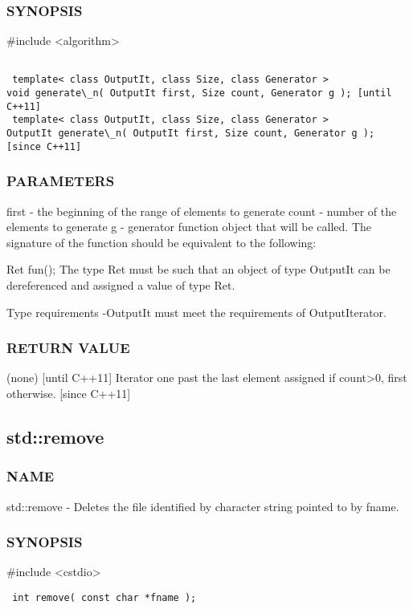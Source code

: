 \subsubsection{SYNOPSIS}
\#include <algorithm>

\begin{lstlisting}

 template< class OutputIt, class Size, class Generator >
void generate\_n( OutputIt first, Size count, Generator g ); [until C++11]
 template< class OutputIt, class Size, class Generator >
OutputIt generate\_n( OutputIt first, Size count, Generator g ); [since C++11]
\end{lstlisting}

\subsubsection{PARAMETERS}
first - the beginning of the range of elements to generate
count - number of the elements to generate
g - generator function object that will be called.
The signature of the function should be equivalent to the following:

 Ret fun();
The type Ret must be such that an object of type OutputIt can be dereferenced and assigned a value of type Ret.

 Type requirements
 -OutputIt must meet the requirements of OutputIterator.

\subsubsection{RETURN VALUE}
 (none) [until C++11]
 Iterator one past the last element assigned if count>0, first otherwise. [since C++11]


\subsection{std::remove}

\subsubsection{NAME}
std::remove - Deletes the file identified by character string pointed to by fname.

\subsubsection{SYNOPSIS}
\#include <cstdio>

\begin{lstlisting}
 int remove( const char *fname );
\end{lstlisting}


